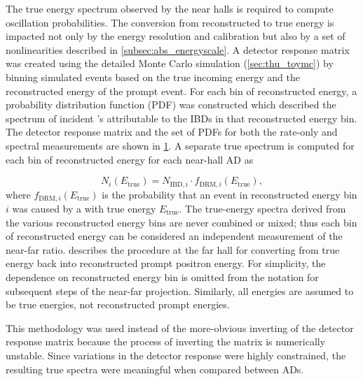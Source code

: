 The true \nuebar{} energy spectrum observed by the near halls
is required to compute oscillation probabilities.
The conversion from reconstructed to true energy
is impacted not only by the energy resolution and calibration
but also by a set of nonlinearities described in \cref{subsec:abs_energyscale}.
A detector response matrix was created
using the detailed Monte Carlo simulation (\cref{sec:thu_toymc})
by binning simulated events based on the true incoming \nuebar{} energy
and the reconstructed energy of the prompt event.
For each bin of reconstructed energy,
a probability distribution function (PDF) was constructed
which described the spectrum of incident \nuebar{}'s
attributable to the IBDs in that reconstructed energy bin.
The detector response matrix and the set of PDFs
for both the rate-only and spectral measurements
are shown in \cref{fig:drm}.
A separate true \nuebar{} spectrum is computed
for each bin of reconstructed energy for each near-hall AD as

\begin{equation}
    N_i(E_{\text{true}}) = N_{\text{IBD},i} \cdot f_{\text{DRM},i}(E_{\text{true}}),
\end{equation}
where $f_{\text{DRM},i}(E_{\text{true}})$ is the probability
that an event in reconstructed energy bin $i$
was caused by a \nuebar{} with true energy $E_{\text{true}}$.
The true-energy spectra derived from the various reconstructed energy bins
are never combined or mixed;
thus each bin of reconstructed energy can be considered an independent measurement
of the near-far ratio.
 describes the procedure at the far hall
for converting from true \nuebar{} energy back into reconstructed prompt positron energy.
For simplicity, the dependence on reconstructed energy bin is omitted
from the notation for subsequent steps of the near-far projection.
Similarly, all energies are assumed to be true \nuebar{} energies,
not reconstructed prompt energies.

This methodology was used instead of the more-obvious
inverting of the detector response matrix
because the process of inverting the matrix is numerically unstable.
Since variations in the detector response were highly constrained,
the resulting true \nuebar{} spectra were meaningful when compared between ADs.


\begin{figure}
    \label{fig:drm}
\end{figure}


